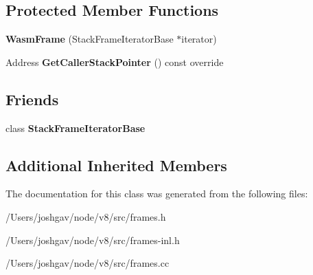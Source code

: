 \subsection*{Protected Member Functions}
\begin{DoxyCompactItemize}
\item 
{\bfseries Wasm\+Frame} (Stack\+Frame\+Iterator\+Base $\ast$iterator)\hypertarget{classv8_1_1internal_1_1_wasm_frame_adbd564e5ebf80a738184c85c6a631517}{}\label{classv8_1_1internal_1_1_wasm_frame_adbd564e5ebf80a738184c85c6a631517}

\item 
Address {\bfseries Get\+Caller\+Stack\+Pointer} () const  override\hypertarget{classv8_1_1internal_1_1_wasm_frame_a38e9cdf804d96a8964cdbd8a23639ed9}{}\label{classv8_1_1internal_1_1_wasm_frame_a38e9cdf804d96a8964cdbd8a23639ed9}

\end{DoxyCompactItemize}
\subsection*{Friends}
\begin{DoxyCompactItemize}
\item 
class {\bfseries Stack\+Frame\+Iterator\+Base}\hypertarget{classv8_1_1internal_1_1_wasm_frame_ac7310421866976ca454bbe11c5f926c3}{}\label{classv8_1_1internal_1_1_wasm_frame_ac7310421866976ca454bbe11c5f926c3}

\end{DoxyCompactItemize}
\subsection*{Additional Inherited Members}


The documentation for this class was generated from the following files\+:\begin{DoxyCompactItemize}
\item 
/\+Users/joshgav/node/v8/src/frames.\+h\item 
/\+Users/joshgav/node/v8/src/frames-\/inl.\+h\item 
/\+Users/joshgav/node/v8/src/frames.\+cc\end{DoxyCompactItemize}
